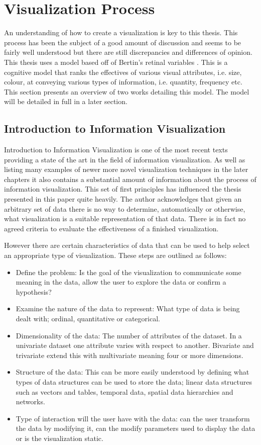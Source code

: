 \documentclass[a4paper, 11pt, titlepage, onehalfspacing]{report}
\begin{document}
	\section{Visualization Process}
An understanding of how to create a visualization is key to this thesis. This process has been the subject of a good amount of discussion and seems to be fairly well understood but there are still discrepancies and differences of opinion. This thesis uses a model based off of Bertin's retinal variables \cite{bertin1973semiologie}. This is a cognitive model that ranks the effectives of various visual attributes, i.e. size, colour, at conveying various types of information, i.e. quantity, frequency etc. This section presents an overview of two works detailing this model. The model will be detailed in full in a later section.


\subsection{Introduction to Information Visualization}
\label{Intro_to_info_vis}
Introduction to Information Visualization \cite{mazza2009introduction} is one of the most recent texts providing a state of the art in the field of information visualization. As well as listing many examples of newer more novel visualization techniques in the later chapters it also contains a substantial amount of information about the process of information visualization. This set of first principles has influenced the thesis presented in this paper quite heavily. The author acknowledges that given an arbitrary set of data there is no way to determine, automatically or otherwise, what visualization is a suitable representation of that data. There is in fact no agreed criteria to evaluate the effectiveness of a finished visualization.

However there are certain characteristics of data that can be used to help select an appropriate type of visualization. These steps are outlined as follows:
\begin{itemize}
\item Define the problem: Is the goal of the visualization to communicate some meaning in the data, allow the user to explore the data or confirm a hypothesis?
\item Examine the nature of the data to represent: What type of data is being dealt with; ordinal, quantitative or categorical.
\item Dimensionality of the data: The number of attributes of the dataset. In a univariate dataset one attribute varies with respect to another. Bivariate and trivariate extend this with multivariate meaning four or more dimensions.
\item Structure of the data: This can be more easily understood by defining what types of data structures can be used to store the data; linear data structures such as vectors and tables, temporal data, spatial data hierarchies and networks.
\item Type of interaction will the user have with the data: can the user transform the data by modifying it, can the modify parameters used to display the data or is the visualization static.
\end{itemize}
\end{document}
